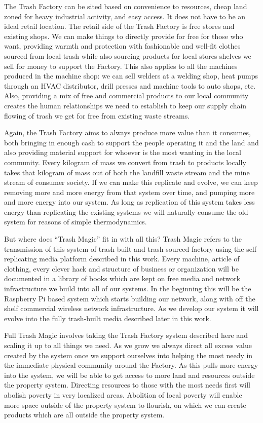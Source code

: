 The Trash Factory can be sited based on convenience to resources, cheap
land zoned for heavy industrial activity, and easy access. It does not
have to be an ideal retail location. The retail side of the Trash
Factory is free stores and existing shops. We can make things to
directly provide for free for those who want, providing warmth and
protection with fashionable and well-fit clothes sourced from local
trash while also sourcing products for local stores shelves we sell for
money to support the Factory. This also applies to all the machines
produced in the machine shop: we can sell welders at a welding shop,
heat pumps through an HVAC distributor, drill presses and machine tools
to auto shops, etc. Also, providing a mix of free and commercial
products to our local community creates the human relationships we need
to establish to keep our supply chain flowing of trash we get for free
from existing waste streams.

Again, the Trash Factory aims to always produce more value than it
consumes, both bringing in enough cash to support the people operating
it and the land and also providing material support for whoever is the
most wanting in the local community. Every kilogram of mass we convert
from trash to products locally takes that kilogram of mass out of both
the landfill waste stream and the mine stream of consumer society. If we
can make this replicate and evolve, we can keep removing more and more
energy from that system over time, and pumping more and more energy into
our system. As long as replication of this system takes less energy than
replicating the existing systems we will naturally consume the old
system for reasons of simple thermodynamics.

But where does ``Trash Magic'' fit in with all this? Trash Magic refers
to the transmission of this system of trash-built and trash-sourced
factory using the self-replicating media platform described in this
work. Every machine, article of clothing, every clever hack and
structure of business or organization will be documented in a library of
books which are kept on free media and network infrastructure we build
into all of our systems. In the beginning this will be the Raspberry Pi
based system which starts building our network, along with off the shelf
commercial wireless network infrastructure. As we develop our system it
will evolve into the fully trash-built media described later in this
work.

Full Trash Magic involves taking the Trash Factory system described here
and scaling it up to all things we need. As we grow we always direct all
excess value created by the system once we support ourselves into
helping the most needy in the immediate physical community around the
Factory. As this pulls more energy into the system, we will be able to
get access to more land and resources outside the property system.
Directing resources to those with the most needs first will abolish
poverty in very localized areas. Abolition of local poverty will enable
more space outside of the property system to flourish, on which we can
create products which are all outside the property system.

